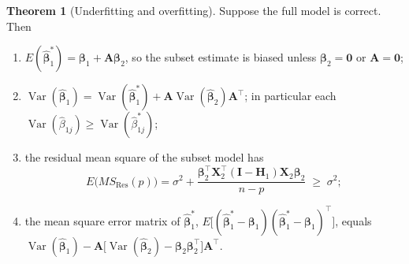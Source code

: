 \documentclass[11pt,a4paper]{article}
\numberwithin{equation}{section}
\theoremstyle{definition}
\newtheorem{thm}{Theorem}[subsection]
\begin{document}
\begin{thm}[Underfitting and overfitting]\label{thm:under-over}
Suppose the full model is correct. Then
\begin{enumerate}[label=(\roman*)]
\item $E(\hat{\boldsymbol\beta}_1^*) = \boldsymbol\beta_1 + \mathbf{A}\boldsymbol\beta_2$, so the subset estimate is biased unless
$\boldsymbol\beta_2 = \mathbf{0}$ or $\mathbf{A} = \mathbf{0}$;
\item $\operatorname{Var}(\hat{\boldsymbol\beta}_1) = \operatorname{Var}(\hat{\boldsymbol\beta}_1^*) + \mathbf{A}\operatorname{Var}(\hat{\boldsymbol\beta}_2)\mathbf{A}^\top$; in
particular each $\operatorname{Var}(\hat\beta_{1j}) \ge \operatorname{Var}(\hat\beta^*_{1j})$;
\item the residual mean square of the subset model has
\[
E\bigl(MS_{\mathrm{Res}}(p)\bigr) = \sigma^2 + \frac{\boldsymbol\beta_2^\top\mathbf{X}_2^\top(\mathbf{I} - \mathbf{H}_1)\mathbf{X}_2\boldsymbol\beta_2}{n - p} \;\ge\; \sigma^2 ;
\]
\item the mean square error matrix of $\hat{\boldsymbol\beta}_1^*$,
$E\bigl[(\hat{\boldsymbol\beta}_1^* - \boldsymbol\beta_1)(\hat{\boldsymbol\beta}_1^* - \boldsymbol\beta_1)^\top\bigr]$, equals
$\operatorname{Var}(\hat{\boldsymbol\beta}_1) - \mathbf{A}\bigl[\operatorname{Var}(\hat{\boldsymbol\beta}_2) - \boldsymbol\beta_2\boldsymbol\beta_2^\top\bigr]\mathbf{A}^\top$.
\end{enumerate}
\end{thm}
\end{document}
